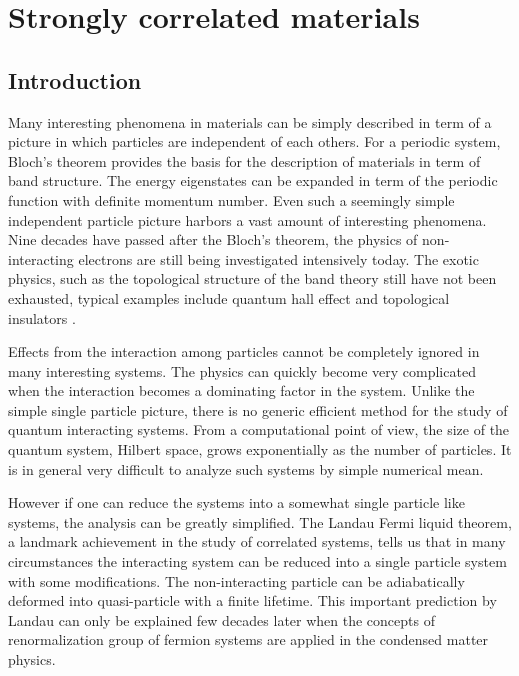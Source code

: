 

\chapter{Strongly correlated materials}
\label{chap:cthyb}
\section{Introduction}

Many interesting phenomena in materials can be simply described in term
of a picture in which particles are independent of each others. For a periodic
system, Bloch's theorem provides the basis for the description of materials
in term of band structure. The energy eigenstates can be expanded in term
of the periodic function with definite momentum number. Even such a seemingly
simple independent particle picture harbors a vast amount of interesting phenomena.
Nine decades have passed after the Bloch's theorem, the physics of non-interacting electrons are
still being investigated intensively today. The exotic physics, such as 
the topological structure of the band theory still have not been exhausted,
typical examples include quantum hall effect and topological insulators \cite{Qi-Zhang-2011}.

Effects from the interaction among particles cannot be completely ignored in many
interesting systems. The physics can quickly become very complicated when
the interaction becomes a dominating factor in the system. Unlike the simple
single particle picture, there is no generic efficient method for the study 
of quantum interacting systems. From a computational point of view, the size
of the quantum system, Hilbert space, grows exponentially as the number of 
particles. It is in general very difficult to analyze such systems by simple numerical mean.

However if one can reduce the systems into a somewhat single particle like systems,
the analysis can be greatly simplified. The Landau Fermi liquid theorem, a landmark
achievement in the study of correlated systems, tells us that in many
circumstances the interacting system can be reduced into a single particle system with
some modifications. \cite{Landau-1957a,Landau-1957b} The non-interacting particle can be adiabatically deformed
into quasi-particle with a finite lifetime. This important prediction by Landau
can only be explained few decades later when the concepts of renormalization group
of fermion systems are applied in the condensed matter physics.

